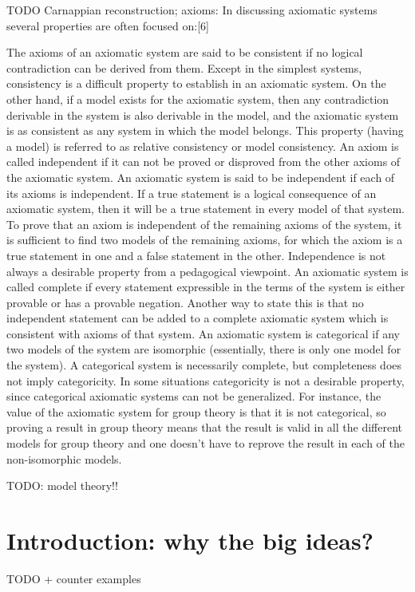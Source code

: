 \documentclass{report}
\begin{document}
TODO Carnappian reconstruction; axioms:
In discussing axiomatic systems several properties are often focused on:[6]

    The axioms of an axiomatic system are said to be consistent if no logical contradiction can be derived from them. Except in the simplest systems, consistency is a difficult property to establish in an axiomatic system. On the other hand, if a model exists for the axiomatic system, then any contradiction derivable in the system is also derivable in the model, and the axiomatic system is as consistent as any system in which the model belongs. This property (having a model) is referred to as relative consistency or model consistency.
    An axiom is called independent if it can not be proved or disproved from the other axioms of the axiomatic system. An axiomatic system is said to be independent if each of its axioms is independent. If a true statement is a logical consequence of an axiomatic system, then it will be a true statement in every model of that system. To prove that an axiom is independent of the remaining axioms of the system, it is sufficient to find two models of the remaining axioms, for which the axiom is a true statement in one and a false statement in the other. Independence is not always a desirable property from a pedagogical viewpoint.
    An axiomatic system is called complete if every statement expressible in the terms of the system is either provable or has a provable negation. Another way to state this is that no independent statement can be added to a complete axiomatic system which is consistent with axioms of that system.
    An axiomatic system is categorical if any two models of the system are isomorphic (essentially, there is only one model for the system). A categorical system is necessarily complete, but completeness does not imply categoricity. In some situations categoricity is not a desirable property, since categorical axiomatic systems can not be generalized. For instance, the value of the axiomatic system for group theory is that it is not categorical, so proving a result in group theory means that the result is valid in all the different models for group theory and one doesn't have to reprove the result in each of the non-isomorphic models.

TODO: model theory!!

\chapter{Introduction: why the big ideas?}
TODO + counter examples
\end{document}
